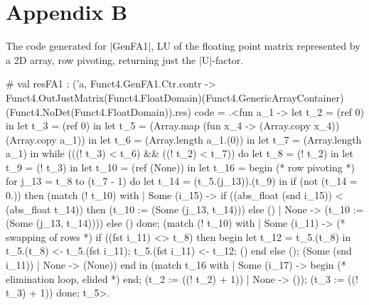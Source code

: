 \documentclass[draft]{elsart}
\begin{document}
\section{Appendix B}
The code generated for |GenFA1|, LU of the floating point matrix
represented by a 2D array, row pivoting, returning just the |U|-factor.
\begin{code2}
# val resFA1 : ('a,
   Funct4.GenFA1.Ctr.contr ->
   Funct4.OutJustMatrix(Funct4.FloatDomain)(Funct4.GenericArrayContainer)
                       (Funct4.NoDet(Funct4.FloatDomain)).res) code =
  .<fun a_1 ->
   let t_2 = (ref 0) in let t_3 = (ref 0) in
   let t_5 = (Array.map (fun x_4 -> (Array.copy x_4)) (Array.copy a_1)) in
   let t_6 = (Array.length a_1.(0)) in
   let t_7 = (Array.length a_1) in
   while (((! t_3) < t_6) && ((! t_2) < t_7)) do
    let t_8 = (! t_2) in let t_9 = (! t_3) in
    let t_10 = (ref (None)) in
    let t_16 =
     begin  (* row pivoting *)
      for j_13 = t_8 to (t_7 - 1) do
       let t_14 = (t_5.(j_13)).(t_9) in
       if (not (t_14 = 0.)) then
        (match (! t_10) with
         | Some (i_15) ->
            if ((abs_float (snd i_15)) < (abs_float t_14)) then
             (t_10 := (Some (j_13, t_14)))
            else ()
         | None -> (t_10 := (Some (j_13, t_14))))
       else ()
      done;
      (match (! t_10) with
       | Some (i_11) -> (* swapping of rows *)
          if ((fst i_11) <> t_8) then begin
           let t_12 = t_5.(t_8) in
           t_5.(t_8) <- t_5.(fst i_11);
           t_5.(fst i_11) <- t_12; () end else ();
          (Some (snd i_11))
       | None -> (None))
     end in
    (match t_16 with
     | Some (i_17) ->
        begin (* elimination loop, elided *) end;
        (t_2 := ((! t_2) + 1))
     | None -> ());
    (t_3 := ((! t_3) + 1))
   done;
   t_5>.
\end{code2}
\end{document}
